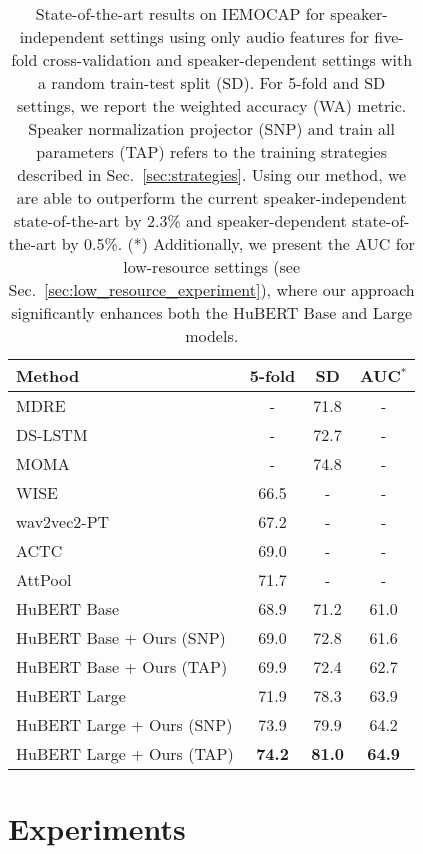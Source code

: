 \documentclass{article}
\renewcommand{\[}{\begin{eqnarray}}
\renewcommand{\]}{\end{eqnarray}}
\begin{document}
\begin{table}[t!]
    \centering
    \begin{tabular}{lccc}
        \toprule
        Method  & 5-fold & SD & AUC$^{*}$\\
        \hline
        MDRE~\cite{yoon2018multimodal} & - & 71.8 & - \\
        DS-LSTM~\cite{wang2020speech} & - & 72.7 & - \\
        MOMA~\cite{moma} & - & 74.8 & - \\
        WISE~\cite{wise} & 66.5 & - & - \\
        wav2vec2-PT~\cite{pepino21_interspeech} & 67.2 & - & - \\
        ACTC~\cite{actc} & 69.0 & - & - \\
        AttPool~\cite{li18c_interspeech} & 71.7 & - & - \\
        \hline
        HuBERT Base~\cite{hubert, s3prl} & 68.9 & 71.2 & 61.0 \\
        HuBERT Base + Ours (SNP) & 69.0 & 72.8 & 61.6\\
        HuBERT Base + Ours (TAP)  & 69.9 & 72.4 & 62.7\\
        \hline
        HuBERT Large~\cite{hubert, s3prl} & 71.9 & 78.3 & 63.9 \\
        HuBERT Large + Ours (SNP)  & 73.9 & 79.9 & 64.2 \\
        HuBERT Large + Ours (TAP)  & \textbf{74.2} & \textbf{81.0} & \textbf{64.9}\\
        \bottomrule
    \end{tabular}
    \caption{State-of-the-art results on IEMOCAP for speaker-independent settings using only audio features for five-fold cross-validation and speaker-dependent settings with a random train-test split (SD). For 5-fold and SD settings, we report the weighted accuracy (WA) metric. Speaker normalization projector (SNP) and train all parameters (TAP) refers to the training strategies described in Sec.~\ref{sec:strategies}. Using our method, we are able to outperform the current speaker-independent state-of-the-art by 2.3\% and speaker-dependent state-of-the-art by 0.5\%. (*) Additionally, we present the AUC for low-resource settings (see Sec.~\ref{sec:low_resource_experiment}), where our approach significantly enhances both the HuBERT Base and Large models.}
    \label{tab:results}
    \vspace{-0.4cm}
\end{table}


\section{Experiments}\label{sec:experiments}
\end{document}
